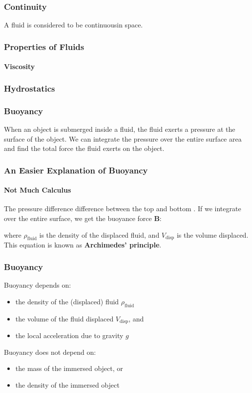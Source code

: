 \documentclass[12pt,aspectratio=169]{beamer}
\newcommand{\mb}[1]{\mathbf{#1}}
\newcommand{\eq}[2]{\vspace{#1}{\Large\begin{displaymath}#2\end{displaymath}}}
\begin{document}
\begin{frame}
  \frametitle{Continuity}
  A fluid is considered to be continuousin space.
\end{frame}


\begin{frame}
  \frametitle{Properties of Fluids}
  \framesubtitle{Viscosity}
\end{frame}


\begin{frame}
  \frametitle{Hydrostatics}
\end{frame}


\begin{frame}
  \frametitle{Buoyancy}
  When an object is submerged inside a fluid, the fluid exerts a pressure at
  the surface of the object. We can integrate the pressure over the entire
  surface area and find the total force the fluid exerts on the object.
\end{frame}



\begin{frame}
  \frametitle{An Easier Explanation of Buoyancy}
  \framesubtitle{Not Much Calculus}

  The pressure difference difference between the top and bottom . If we
  integrate over the entire surface, we get the buoyance force $\mb{B}$:

  \eq{-.2in}{
    \boxed{\mb{B}=\rho_{\textrm{fluid}}gV_{\textrm{disp}}}
  }

  where $\rho_{\textrm{fluid}}$ is the density of the displaced fluid, and
  $V_{\textrm{disp}}$ is the volume displaced. This equation is known as
  \textbf{Archimedes' principle}.
\end{frame}


\begin{frame}
  \frametitle{Buoyancy}

  Buoyancy depends on:
  \begin{itemize}
  \item the density of the (displaced) fluid $\rho_{\textrm{fluid}}$
  \item the volume of the fluid displaced $V_{\textrm{disp}}$, and
  \item the local acceleration due to gravity $g$
  \end{itemize}
  Buoyancy does not depend on:
  \begin{itemize}
  \item the mass of the immersed object, or
  \item the density of the immersed object
  \end{itemize}
\end{frame}
\end{document}

